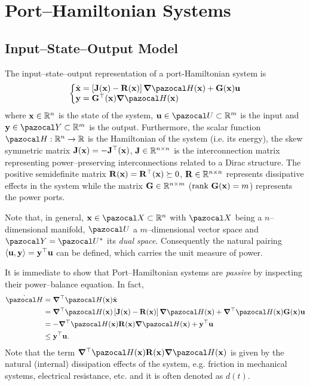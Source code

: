 \section{Port--Hamiltonian Systems\label{sec:PH_systems}}
%
%
\subsection{Input--State--Output Model}
%
The input--state--output representation of a port-Hamiltonian system is
%
\begin{equation}\label{eq:PHsys}
	\left\{
	    \begin{matrix*}[l]
	        \dot{\xb} = \left[\mathbf{J}(\xb) - \mathbf{R}(\xb)\right]\bm{\nabla}\Ha(\xb) + \mathbf{G}(\xb)\mathbf{u}\\
	        \mathbf{y} = \mathbf{G}^\top(\xb)\bm{\nabla}\Ha(\xb) 
	    \end{matrix*}
	\right.
\end{equation}
%
where $\mathbf{x}\in\mathbb{R}^n$ is the state of the system, $\ub\in\U\subset\R^m$ is the input and $\yb\in\Y\subset\R^m$ is the output.
Furthermore, the scalar function $\Ha:\R^n\rightarrow\R$ is the Hamiltonian of the system (i.e. its energy), the skew symmetric matrix $\mathbf{J}(\mathbf{x}) = -\mathbf{J}^\top(\mathbf{x})$, $\mathbf{J}\in\mathbb{R}^{n\times n}$ is the interconnection matrix representing power--preserving interconnections related to a Dirac structure. The positive semidefinite matrix $\mathbf{R}(\mathbf{x}) = \mathbf{R}^\top(\mathbf{x})\succeq 0$, $\mathbf{R}\in\mathbb{R}^{n\times n}$ represents dissipative effects in the system while the matrix $\mathbf{G}\in\mathbb{R}^{n\times m}$ ($\text{rank}~ \mathbf{G}(\mathbf{x}) = m$) represents the power ports.
%
\newline

%
Note that, in general, $\xb\in\X\subset\R^n$ with $\X$ being a $n$--dimensional manifold, $\U$ a $m$--dimensional vector space and $\Y = \U^*$ its \textit{dual space}. Consequently the natural pairing $\langle\mathbf{u},\mathbf{y}\rangle = \mathbf{y}^\top\mathbf{u}$ can be defined, which carries the unit measure of power.
%
\newline

%
It is immediate to show that Port--Hamiltonian systems are \textit{passive} by inspecting their power--balance equation. In fact,
%
\begin{align}
    \dot{\Ha} &= \bm{\nabla}^\top\Ha(\x)\dot{\x} \\
              &= \bm{\nabla}^\top\Ha(\x)\left[\mathbf{J}(\xb) - \mathbf{R}(\xb)\right]\bm{\nabla}\Ha(\xb) + \bm{\nabla}^\top\Ha(\x)\mathbf{G}(\xb)\mathbf{u} \\
              &= -\bm{\nabla}^\top\Ha(\x)\mathbf{R}(\xb)\bm{\nabla}\Ha(\xb) + \yb^\top\ub \\
              &\leq \yb^\top\ub.
\end{align}
%
Note that the term $\bm{\nabla}^\top\Ha(\x)\mathbf{R}(\xb)\bm{\nabla}\Ha(\xb)$ is given by the natural (internal) dissipation effects of the system, e.g. friction in mechanical systems, electrical resistance, etc. and it is often denoted as $d(t)$.
%

